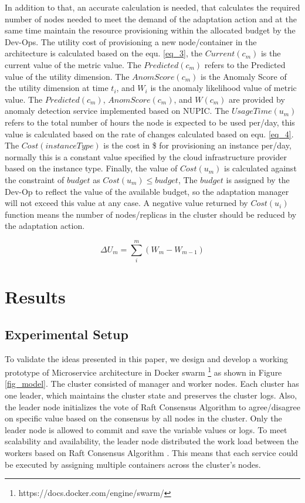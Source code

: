 \documentclass[graybox]{svmult}
\begin{document}
 In addition to that, an accurate calculation is needed, that calculates the required number of nodes needed to meet the demand of the adaptation action and at the same time maintain the resource provisioning within the allocated budget by the Dev-Ops. The utility cost of provisioning a new node/container in the architecture is calculated based on the equ. \ref{eq_3}, the $Current(c_{m})$ is the current value of the metric value. The $Predicted(c_{m})$ refers to the Predicted value of the utility dimension. The $AnomScore(c_{m})$ is the Anomaly Score of the utility dimension at time $t_{i}$, and $W_{i}$ is the anomaly likelihood value of metric value. The $Predicted(c_{m})$, $AnomScore(c_{m})$, and $W(c_{m})$ are provided by anomaly detection service implemented based on NUPIC. The $UsageTime(u_{m})$ refers to the total number of hours the node is expected to be used per/day, this value is calculated based on the rate of changes calculated based on equ. \ref{eq_4}. The $Cost(instanceType)$ is the cost in \$ for provisioning an instance per/day, normally this is a constant value specified by the cloud infrastructure provider based on the instance type. Finally, the value of $Cost(u_{m})$ is calculated against the constraint of $budget$ as $ Cost(u_{m})  \leq  budget $, The $budget$ is assigned by the Dev-Op to reflect the value of the available budget, so the adaptation manager will not exceed this value at any case. A negative value returned by $Cost(u_{i})$ function means the number of nodes/replicas in the cluster should be reduced by the adaptation action. 

 \begin{equation}
\label{eq_4}
\Delta U_{m}=\sum_{i}^{m} (W_{m} - W_{m-1})
\end{equation}
 
\section{Results} 
\label{sec:evaluation}
\subsection{Experimental Setup}
To validate the ideas presented in this paper, we design and develop a working prototype of Microservice architecture in Docker swarm \footnote{https://docs.docker.com/engine/swarm/} as shown in Figure \ref{fig_model}. The cluster consisted of manager and worker nodes. Each cluster has one leader, which maintains the cluster state and preserves the cluster logs. Also, the leader node initializes the vote of Raft Consensus Algorithm \cite{ongaro2015raft} to agree/disagree on specific value based on the consensus by all nodes in the cluster. Only the leader node is allowed to commit and save the variable values or logs. To meet scalability and availability, the leader node distributed the work load between the workers based on Raft Consensus Algorithm \cite{ongaro2015raft}. This means that each service could be executed by assigning multiple containers across the cluster's nodes. 
\end{document}
